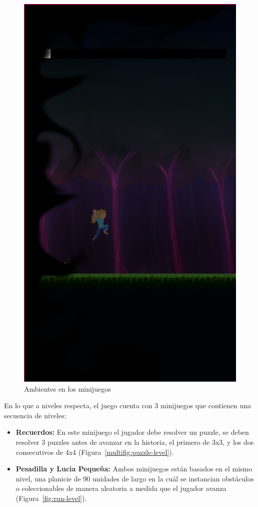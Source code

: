 \begin{figure}[h]
\begin{minipage}{.22\textwidth}
        \includegraphics[width=\textwidth]{imgs/screenshot05.png}
    \end{minipage}
    \caption{Ambientes en los minijuegos}
    \label{multifig:ambientes}
\end{figure}

En lo que a niveles respecta, el juego cuenta con 3 minijuegos que contienen una secuencia de niveles:
\begin{itemize}
    \item \textbf{Recuerdos:} En este minijuego el jugador debe resolver un puzzle, se deben resolver 3 puzzles antes de avanzar en la historia, el primero de 3x3, y los dos consecutivos de 4x4 (Figura~\ref{multifig:puzzle-level}).
    \item \textbf{Pesadilla y Lucia Pequeña:} Ambos minijuegos están basados en el mismo nivel, una planicie de 90 unidades de largo en la cuál se instancian obstáculos o coleccionables de manera aleatoria a medida que el jugador avanza (Figura~\ref{fig:run-level}).
\end{itemize}

